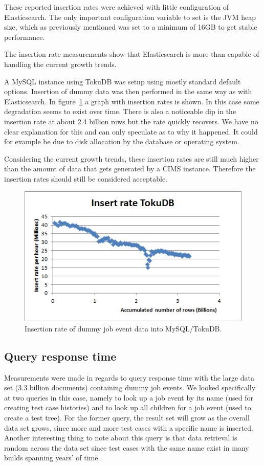 These reported insertion rates were achieved with little configuration of Elasticsearch. The only important configuration variable to set is the JVM heap size, which as previously mentioned was set to a minimum of 16GB to get stable performance.

The insertion rate measurements show that Elasticsearch is more than capable of handling the current growth trends.


A MySQL instance using TokuDB was setup using mostly standard default options. Insertion of dummy data was then performed in the same way as with Elasticsearch. In figure~\ref{fig:insert_rate_tokudb} a graph with insertion rates is shown. In this case some degradation seems to exist over time. There is also a noticeable dip in the insertion rate at about 2.4 billion rows but the rate quickly recovers. We have no clear explanation for this and can only speculate as to why it happened. It could for example be due to disk allocation by the database or operating system.

Considering the current growth trends, these insertion rates are still much higher than the amount of data that gets generated by a CIMS instance. Therefore the insertion rates should still be considered acceptable.
\begin{figure}[h!]
\centering
\includegraphics[]{figure/insert_rate_tokudb.png}
\caption{Insertion rate of dummy job event data into MySQL/TokuDB.}
\label{fig:insert_rate_tokudb}
\end{figure}

\subsection{Query response time}
Measurements were made in regards to query response time with the large data set (3.3 billion documents) containing dummy job events. We looked specifically at two queries in this case, namely to look up a job event by its name (used for creating test case histories) and to look up all children for a job event (used to create a test tree). For the former query, the result set will grow as the overall data set grows, since more and more test cases with a specific name is inserted. Another interesting thing to note about this query is that data retrieval is random across the data set since test cases with the same name exist in many builds spanning years' of time.

